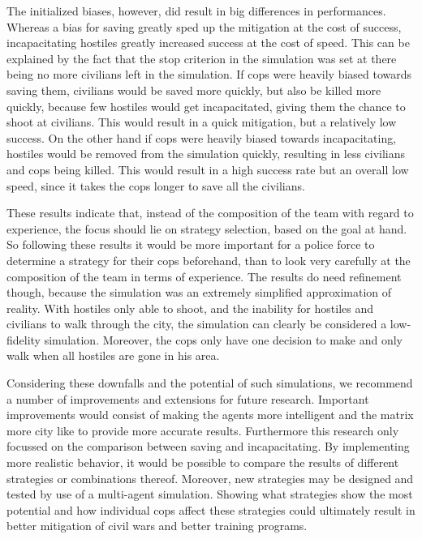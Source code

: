 The initialized biases, however, did result in big differences in performances. Whereas a bias for saving greatly sped up the mitigation at the cost of success, incapacitating hostiles greatly increased success at the cost of speed. This can be explained by the fact that the stop criterion in the simulation was set at there being no more civilians left in the simulation. If cops were heavily biased towards saving them, civilians would be saved more quickly, but also be killed more quickly, because few hostiles would get incapacitated, giving them the chance to shoot at civilians. This would result in a quick mitigation, but a relatively low success. On the other hand if cops were heavily biased towards incapacitating, hostiles would be removed from the simulation quickly, resulting in less civilians and cops being killed. This would result in a high success rate but an overall low speed, since it takes the cops longer to save all the civilians.

These results indicate that, instead of the composition of the team with regard to experience, the focus should lie on strategy selection, based on the goal at hand. So following these results it would be more important for a police force to determine a strategy for their cops beforehand, than to look very carefully at the composition of the team in terms of experience. The results do need refinement though, because the simulation was an extremely simplified approximation of reality. With hostiles only able to shoot, and the inability for hostiles and civilians to walk through the city, the simulation can clearly be considered a low-fidelity simulation. Moreover, the cops only have one decision to make and only walk when all hostiles are gone in his area.

Considering these downfalls and the potential of such simulations, we recommend a number of improvements and extensions for future research. Important improvements would consist of making the agents more intelligent and the matrix more city like to provide more accurate results. Furthermore this research only focussed on the comparison between saving and incapacitating. By implementing more realistic behavior, it would be possible to 
compare the results of different strategies or combinations thereof. Moreover, new strategies may be designed and tested by use of a multi-agent simulation. Showing what strategies show the most 
potential and how individual cops affect these strategies could ultimately result in better mitigation of civil wars and better training programs. 

